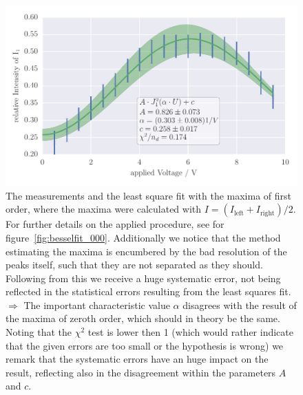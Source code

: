 \newpage

\begin{figure}[htpb]
    \centering
    \includegraphics[width=1\textwidth]{analysis/figures/besselfit_001}
    \caption{
        The measurements and the least square fit with the maxima of first order, where
        the maxima were calculated with $I = (I_{\mathrm{left}} +  I_{\mathrm{right}})/2$.
        For further details on the applied procedure, see for figure~\ref{fig:besselfit_000}.
        Additionally we notice that the method estimating the maxima is encumbered by the 
        bad resolution of the peaks itself, such that they are not separated as they should. 
        Following from this we receive a huge systematic error, not being reflected in the
        statistical errors resulting from the least squares fit. \\
        $\Rightarrow$ The important characteristic value $\alpha$ disagrees 
        with the result of the maxima of zeroth order, which
        should in theory be the same. Noting that the $\chi^2$ test is lower then 1 (which would rather indicate that
        the given errors are too small or the hypothesis is wrong) we remark that the 
        systematic errors have an huge impact on the result, reflecting
        also in the disagreement within the parameters $A$ and $c$. 
        }
    \label{fig:besselfit_001}
\end{figure}


